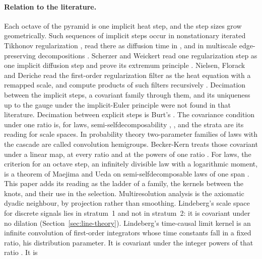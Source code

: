 \paragraph{Relation to the literature.} Each octave of the \Matern{} pyramid is one implicit heat
step, and the step sizes grow geometrically. Such sequences of implicit steps occur in nonstationary
iterated Tikhonov regularization \cite[pp.~38--39]{hanke1998nonstationary}, read there as diffusion time in
\cite[p.~98]{radmoser2000scale}, and in multiscale edge-preserving decompositions
\cite[\S 3.1, (13)--(14)]{farbman2008edge}. Scherzer and Weickert read one regularization step as
one implicit diffusion step and prove its extremum principle
\cite[p.~43; Lemma~6, p.~53]{scherzer2000relations}.
Nielsen, Florack and Deriche read the first-order regularization filter as the heat equation with a
remapped scale, and compute products of such filters recursively
\cite[pp.~296--298]{nielsen1997regularization}.
Decimation between the implicit steps, a covariant family through them, and its uniqueness up to
the gauge under the implicit-Euler principle were not found in that literature. Decimation between explicit steps is Burt's \cite[\S 4, p.~29]{burt1981fast}. The
covariance condition under one ratio is, for laws, semi-selfdecomposability
\cite[Def.~3.1, p.~19]{maejima1998semi}, \cite[Def.~15.1, p.~90]{sato1999levy}, and the strata are
its reading for scale spaces. In probability theory two-parameter families of laws with the
cascade are called convolution hemigroups. Becker-Kern treats those covariant under a linear map,
at every ratio and at the powers of one ratio \cite[p.~574]{becker-kern2003stable}. For laws, the criterion for an octave step, an infinitely divisible
law with a logarithmic moment, is a theorem of Maejima and Ueda on semi-selfdecomposable laws of one
span \cite[Thm.~3.3, p.~353]{maejima2009stochastic}. This paper adds its reading as the ladder of a
family, the kernels between the knots, and their use in the selection. Multiresolution analysis \cite[(2)--(8), p.~676]{mallat1989theory} is the axiomatic dyadic
neighbour, by projection rather than smoothing. Lindeberg's scale space for discrete signals
\cite{lindeberg1990scalespace} lies in stratum~1 and not in stratum~2: it is covariant under no
dilation (Section~\ref{sec:line-theory}). Lindeberg's time-causal limit kernel is an infinite
convolution of first-order integrators whose time constants fall in a fixed ratio, his distribution
parameter. It is covariant under the integer powers of that ratio
\cite[\S 5, p.~62; (47), p.~63]{lindeberg2016time}. It is
